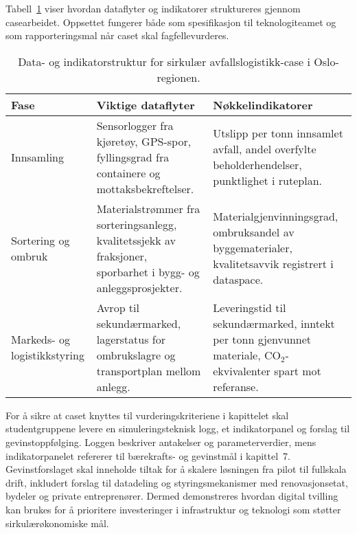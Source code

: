 Tabell~\ref{tab:kap04-avfall-simulering} viser hvordan dataflyter og indikatorer struktureres gjennom casearbeidet. Oppsettet fungerer både som spesifikasjon til teknologiteamet og som rapporteringsmal når caset skal fagfellevurderes.

\begin{table}[htbp]
    \centering
    \begin{tabular}{p{}p{}p{}}
        \toprule
        \textbf{Fase} & \textbf{Viktige dataflyter} & \textbf{Nøkkelindikatorer}\\
        \midrule
        Innsamling & Sensorlogger fra kjøretøy, GPS-spor, fyllingsgrad fra containere og mottaksbekreftelser. & Utslipp per tonn innsamlet avfall, andel overfylte beholderhendelser, punktlighet i ruteplan.\\
        Sortering og ombruk & Materialstrømmer fra sorteringsanlegg, kvalitetssjekk av fraksjoner, sporbarhet i bygg- og anleggsprosjekter. & Materialgjenvinningsgrad, ombruksandel av byggematerialer, kvalitetsavvik registrert i dataspace.\\
        Markeds- og logistikkstyring & Avrop til sekundærmarked, lagerstatus for ombrukslagre og transportplan mellom anlegg. & Leveringstid til sekundærmarked, inntekt per tonn gjenvunnet materiale, CO$_2$-ekvivalenter spart mot referanse.\\
        \bottomrule
    \end{tabular}
    \caption{Data- og indikatorstruktur for sirkulær avfallslogistikk-case i Oslo-regionen.}
    \label{tab:kap04-avfall-simulering}
\end{table}

For å sikre at caset knyttes til vurderingskriteriene i kapittelet skal studentgruppene levere en simuleringsteknisk logg, et indikatorpanel og forslag til gevinstoppfølging. Loggen beskriver antakelser og parameterverdier, mens indikatorpanelet refererer til bærekrafts- og gevinstmål i kapittel~7. Gevinstforslaget skal inneholde tiltak for å skalere løsningen fra pilot til fullskala drift, inkludert forslag til datadeling og styringsmekanismer med renovasjonsetat, bydeler og private entreprenører. Dermed demonstreres hvordan digital tvilling kan brukes for å prioritere investeringer i infrastruktur og teknologi som støtter sirkulærøkonomiske mål.


